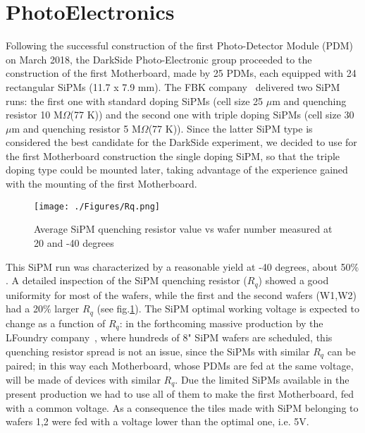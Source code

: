 \label{sec:PE}
\section {PhotoElectronics}


Following the successful construction of the first Photo-Detector Module (PDM) on March 2018, the DarkSide Photo-Electronic group proceeded to the construction of the first Motherboard, made by 25 PDMs,
each equipped with 24 rectangular SiPMs (11.7 x 7.9 mm).
The FBK company~\cite{FBK:2018a}  delivered two SiPM runs: 
the first one with standard doping SiPMs (cell size 25 $\mu$m and quenching resistor 10 M$\Omega$(77 K)) and the second one with triple doping SiPMs (cell size 30 $\mu$m and quenching resistor 5 M$\Omega$(77 K)). Since the latter SiPM type is considered the best candidate for the DarkSide experiment, we decided to use for the first Motherboard construction 
the single doping SiPM, so that the triple doping type could be mounted later, taking advantage of the experience gained with the mounting of the first Motherboard.
\begin{figure} [t]
\texttt{[image: ./Figures/Rq.png]}
\caption{Average SiPM  quenching resistor  value vs wafer number measured at 20 and -40 degrees}
\label{fig:Rq} 
\end{figure} 
 This SiPM run was characterized by a reasonable yield at -40 degrees, about 50$\%$. A detailed inspection of the SiPM quenching resistor ($R_q$) showed a good uniformity for most of the wafers, while the first and the second wafers (W1,W2) had a 20$\%$ larger $R_q$ (see fig.\ref{fig:Rq}). The SiPM optimal working voltage is expected to change as a function of $R_q$: in the forthcoming  massive production by the LFoundry company~\cite{LFoundry:2018a}, where hundreds of 8" SiPM wafers are scheduled, this quenching resistor spread  is not an issue, since the SiPMs with similar $R_q$ can be paired; in this way each Motherboard, whose PDMs are fed at the same voltage, will be made of devices with similar $R_q$. 
Due the limited SiPMs available in the present production we had to use all of them to make the first Motherboard, fed with a common voltage. As a consequence the tiles made with SiPM belonging to wafers 1,2 were fed with a voltage lower than the optimal one, i.e. 5V. 
